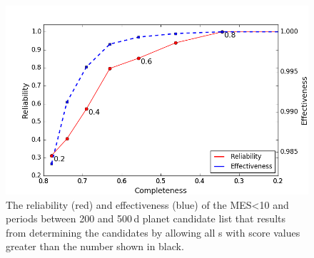 \begin{figure}[h!]
 \begin{center}
  \includegraphics[width=1.0\linewidth]{fig-CRadjustScore-DR25.png}
  \caption{\label{f:adjscore}The reliability (red) and effectiveness (blue) of the MES<10 and periods between 200 and 500\,d planet candidate list that results from determining the candidates by allowing all \opstce s with score values greater than the number shown in black.}
 \end{center}
 \end{figure}


